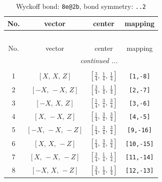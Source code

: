 \documentclass[fleqn,8pt]{jsarticle}
\begin{document}
\begin{longtable}{cccc}
\caption{Wyckoff bond: {\tt 8e@2b}, bond symmetry: {\tt ..2}}
 \\
 \hline \hline
No. & vector & center & mapping \\ \hline \endfirsthead

\multicolumn{3}{l}{\tablename\ \thetable{}} \\
 \hline \hline
No. & vector & center & mapping \\ \hline \endhead

 \hline \hline
\multicolumn{3}{r}{\footnotesize\it continued ...} \\ \endfoot

 \hline \hline
\multicolumn{3}{r}{} \\ \endlastfoot

1 & $\left[ X,\, X,\, Z \right]$ & $\left[ \frac{3}{4},\, \frac{1}{4},\, \frac{1}{4} \right]$ & {\tt [1,-8]} \\ \hline
2 & $\left[ - X,\, - X,\, Z \right]$ & $\left[ \frac{3}{4},\, \frac{1}{4},\, \frac{1}{4} \right]$ & {\tt [2,-7]} \\ \hline
3 & $\left[ - X,\, X,\, Z \right]$ & $\left[ \frac{1}{4},\, \frac{3}{4},\, \frac{3}{4} \right]$ & {\tt [3,-6]} \\ \hline
4 & $\left[ X,\, - X,\, Z \right]$ & $\left[ \frac{1}{4},\, \frac{3}{4},\, \frac{3}{4} \right]$ & {\tt [4,-5]} \\ \hline
5 & $\left[ - X,\, - X,\, - Z \right]$ & $\left[ \frac{1}{4},\, \frac{3}{4},\, \frac{3}{4} \right]$ & {\tt [9,-16]} \\ \hline
6 & $\left[ X,\, X,\, - Z \right]$ & $\left[ \frac{1}{4},\, \frac{3}{4},\, \frac{3}{4} \right]$ & {\tt [10,-15]} \\ \hline
7 & $\left[ X,\, - X,\, - Z \right]$ & $\left[ \frac{3}{4},\, \frac{1}{4},\, \frac{1}{4} \right]$ & {\tt [11,-14]} \\ \hline
8 & $\left[ - X,\, X,\, - Z \right]$ & $\left[ \frac{3}{4},\, \frac{1}{4},\, \frac{1}{4} \right]$ & {\tt [12,-13]} \\
\end{longtable}
\renewcommand{\arraystretch}{1.2}
\end{document}

